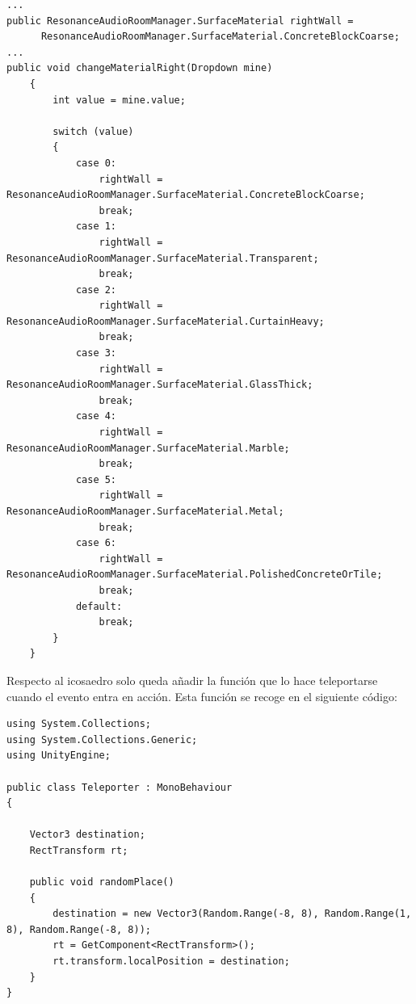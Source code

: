 \lstset{language=[sharp]C, breaklines=true, basicstyle=\footnotesize}
\begin{lstlisting}[frame=single, caption={Función changeMaterialRight}]
...
public ResonanceAudioRoomManager.SurfaceMaterial rightWall =
      ResonanceAudioRoomManager.SurfaceMaterial.ConcreteBlockCoarse;
...
public void changeMaterialRight(Dropdown mine)
    {
        int value = mine.value;

        switch (value)
        {
            case 0:
                rightWall = ResonanceAudioRoomManager.SurfaceMaterial.ConcreteBlockCoarse;
                break;
            case 1:
                rightWall = ResonanceAudioRoomManager.SurfaceMaterial.Transparent;
                break;
            case 2:
                rightWall = ResonanceAudioRoomManager.SurfaceMaterial.CurtainHeavy;
                break;
            case 3:
                rightWall = ResonanceAudioRoomManager.SurfaceMaterial.GlassThick;
                break;
            case 4:
                rightWall = ResonanceAudioRoomManager.SurfaceMaterial.Marble;
                break;
            case 5:
                rightWall = ResonanceAudioRoomManager.SurfaceMaterial.Metal;
                break;
            case 6:
                rightWall = ResonanceAudioRoomManager.SurfaceMaterial.PolishedConcreteOrTile;
                break;
            default:
                break;
        }
    }

\end{lstlisting}



\quad Respecto al icosaedro solo queda añadir la función que lo hace teleportarse cuando el evento entra en acción. Esta función se recoge en el siguiente código:\\

\lstset{language=[sharp]C, breaklines=true, basicstyle=\footnotesize}
\begin{lstlisting}[frame=single, caption={Teleporter.cs}]
using System.Collections;
using System.Collections.Generic;
using UnityEngine;

public class Teleporter : MonoBehaviour
{

    Vector3 destination;
    RectTransform rt;
    
    public void randomPlace()
    {
        destination = new Vector3(Random.Range(-8, 8), Random.Range(1, 8), Random.Range(-8, 8));
        rt = GetComponent<RectTransform>();
        rt.transform.localPosition = destination;
    }
}
\end{lstlisting}

